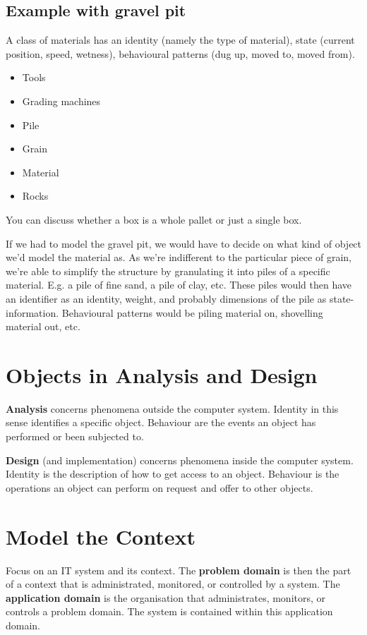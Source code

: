 \subsection{Example with gravel pit}
A class of materials has an identity (namely the type of material), state (current position, speed, wetness), behavioural patterns (dug up, moved to, moved from).

\begin{itemize}
    \item Tools
    \item Grading machines
    \item Pile
    \item Grain
    \item Material
    \item Rocks
\end{itemize}

You can discuss whether a box is a whole pallet or just a single box. 

If we had to model the gravel pit, we would have to decide on what kind of object we'd model the material as. As we're indifferent to the particular piece of grain, we're able to simplify the structure by granulating it into piles of a specific material. E.g. a pile of fine sand, a pile of clay, etc. These piles would then have an identifier as an identity, weight, and probably dimensions of the pile as state-information. Behavioural patterns would be piling material on, shovelling material out, etc.

\section{Objects in Analysis and Design}
\textbf{Analysis} concerns phenomena outside the computer system. Identity in this sense identifies a specific object. Behaviour are the events an object has performed or been subjected to. 

\textbf{Design} (and implementation) concerns phenomena inside the computer system. Identity is the description of how to get access to an object.
Behaviour is the operations an object can perform on request and offer to other objects.

\section{Model the Context}
Focus on an IT system and its context. The \textbf{problem domain} is then the part of a context that is administrated, monitored, or controlled by a system. The \textbf{application domain} is the organisation that administrates, monitors, or controls a problem domain. The system is contained within this application domain.

